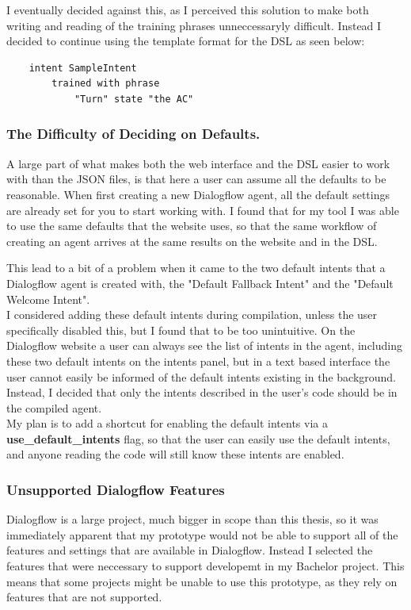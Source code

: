 I eventually decided against this, as I perceived this solution to make both writing and reading of the training phrases unneccessaryly difficult. Instead I decided to continue using the template format for the DSL as seen below:

\begin{verbatim}
    intent SampleIntent
        trained with phrase
            "Turn" state "the AC"
\end{verbatim}

\subsubsection{The Difficulty of Deciding on Defaults.}

A large part of what makes both the web interface and the DSL easier to work with than the JSON files, is that here a user can assume all the defaults to be reasonable. When first creating a new Dialogflow agent, all the default settings are already set for you to start working with. I found that for my tool I was able to use the same defaults that the website uses, so that the same workflow of creating an agent arrives at the same results on the website and in the DSL.

This lead to a bit of a problem when it came to the two default intents that a Dialogflow agent is created with, the "Default Fallback Intent" and the "Default Welcome Intent". \\
I considered adding these default intents during compilation, unless the user specifically disabled this, but I found that to be too unintuitive. On the Dialogflow website a user can always see the list of intents in the agent, including these two default intents on the intents panel, but in a text based interface the user cannot easily be informed of the default intents existing in the background. Instead, I decided that only the intents described in the user's code should be in the compiled agent. \\
My plan is to add a shortcut for enabling the default intents via a \textbf{use\_default\_intents} flag, so that the user can easily use the default intents, and anyone reading the code will still know these intents are enabled.

\subsubsection{Unsupported Dialogflow Features}

Dialogflow is a large project, much bigger in scope than this thesis, so it was immediately apparent that my prototype would not be able to support all of the features and settings that are available in Dialogflow.
Instead I selected the features that were neccessary to support developemt in my Bachelor project.
This means that some projects might be unable to use this prototype, as they rely on features that are not supported.


